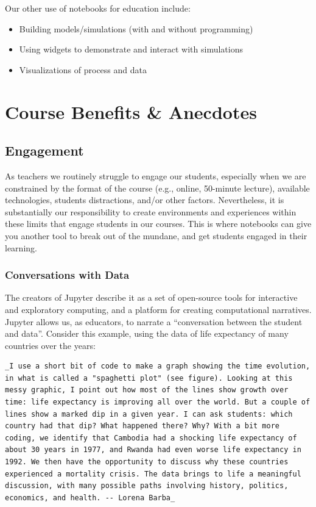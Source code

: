 \documentclass[]{book}
\providecommand{\tightlist}{%
  \setlength{\itemsep}{0pt}\setlength{\parskip}{0pt}}
\begin{document}
Our other use of notebooks for education include:

\begin{itemize}
\tightlist
\item
  Building models/simulations (with and without programming)
\item
  Using widgets to demonstrate and interact with simulations
\item
  Visualizations of process and data
\end{itemize}

\section{Course Benefits \& Anecdotes}\label{course-benefits-anecdotes}

\subsection{Engagement}\label{engagement}

As teachers we routinely struggle to engage our students, especially
when we are constrained by the format of the course (e.g., online,
50-minute lecture), available technologies, students distractions,
and/or other factors. Nevertheless, it is substantially our
responsibility to create environments and experiences within these
limits that engage students in our courses. This is where notebooks can
give you another tool to break out of the mundane, and get students
engaged in their learning.

\subsubsection{Conversations with Data}\label{conversations-with-data}

The creators of Jupyter describe it as a set of open-source tools for
interactive and exploratory computing, and a platform for creating
computational narratives. Jupyter allows us, as educators, to narrate a
``conversation between the student and data''. Consider this example,
using the data of life expectancy of many countries over the years:

\begin{verbatim}
_I use a short bit of code to make a graph showing the time evolution, in what is called a "spaghetti plot" (see figure). Looking at this messy graphic, I point out how most of the lines show growth over time: life expectancy is improving all over the world. But a couple of lines show a marked dip in a given year. I can ask students: which country had that dip? What happened there? Why? With a bit more coding, we identify that Cambodia had a shocking life expectancy of about 30 years in 1977, and Rwanda had even worse life expectancy in 1992. We then have the opportunity to discuss why these countries experienced a mortality crisis. The data brings to life a meaningful discussion, with many possible paths involving history, politics, economics, and health. -- Lorena Barba_
\end{verbatim}
\end{document}
